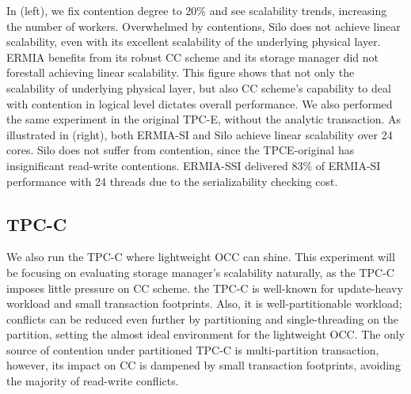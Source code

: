 In (left), we fix contention degree to 20\% and see scalability trends, increasing the number of workers. Overwhelmed by contentions, Silo does not achieve linear scalability, even with its excellent scalability of the underlying physical layer. ERMIA benefits from its robust CC scheme and its storage manager did not forestall achieving linear scalability. This figure shows that not only the scalability of underlying physical layer, but also CC scheme's capability to deal with contention in logical level dictates overall performance. We also performed the same experiment in the original TPC-E, without the analytic transaction. As illustrated in (right), both ERMIA-SI and Silo achieve linear scalability over 24 cores. Silo does not suffer from contention, since the TPCE-original has insignificant read-write contentions. ERMIA-SSI delivered 83\% of ERMIA-SI performance with 24 threads due to the serializability checking cost.

\subsection{TPC-C} 
We also run the TPC-C where lightweight OCC can shine. This experiment will be focusing on evaluating storage manager's scalability naturally, as the TPC-C imposes little pressure on CC scheme. the TPC-C is well-known for update-heavy workload and small transaction footprints. Also, it is well-partitionable workload; conflicts can be reduced even further by partitioning and single-threading on the partition, setting the almost ideal environment for the lightweight OCC. The only source of contention under partitioned TPC-C is multi-partition transaction, however, its impact on CC is dampened by small transaction footprints, avoiding the majority of read-write conflicts. 

